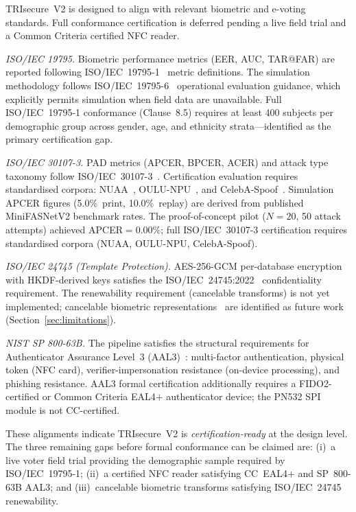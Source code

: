 \documentclass[conference]{IEEEtran}
\begin{document}
TRIsecure~V2 is designed to align with relevant biometric and
e-voting standards. Full conformance certification is deferred pending a
live field trial and a Common Criteria certified NFC reader.

\textit{ISO/IEC 19795.} Biometric performance metrics (EER, AUC,
TAR@FAR) are reported following ISO/IEC~19795-1~\cite{iso19795}
metric definitions. The simulation methodology follows
ISO/IEC~19795-6~\cite{iso19795_6} operational evaluation guidance,
which explicitly permits simulation when field data are unavailable.
Full ISO/IEC~19795-1 conformance (Clause~8.5) requires at least
400 subjects per demographic group across gender, age, and ethnicity
strata—identified as the primary certification gap.

\textit{ISO/IEC 30107-3.} PAD metrics (APCER, BPCER, ACER) and
attack type taxonomy follow ISO/IEC~30107-3~\cite{iso30107}.
Certification evaluation requires standardised corpora:
NUAA~\cite{tan2010nuaa}, OULU-NPU~\cite{boulkenafet2017oulu},
and CelebA-Spoof~\cite{zhang2020minifasnet}. Simulation APCER figures (5.0\%~print, 10.0\%~replay) are derived from
published MiniFASNetV2 benchmark rates. The proof-of-concept pilot
(\(N{=}20\), 50 attack attempts) achieved APCER\(=0.00\%\); full
ISO/IEC~30107-3 certification requires standardised corpora
(NUAA, OULU-NPU, CelebA-Spoof).

\textit{ISO/IEC 24745 (Template Protection).} AES-256-GCM per-database
encryption with HKDF-derived keys satisfies the
ISO/IEC~24745:2022~\cite{iso24745} confidentiality requirement.
The renewability requirement (cancelable transforms) is not
yet implemented; cancelable biometric
representations~\cite{jain2008cancelable} are identified as future
work (Section~\ref{sec:limitations}).

\textit{NIST SP 800-63B.} The pipeline satisfies the structural
requirements for Authenticator Assurance Level~3
(AAL3)~\cite{nist_sp800_63b}: multi-factor authentication,
physical token (NFC card), verifier-impersonation resistance
(on-device processing), and phishing resistance. AAL3 formal
certification additionally requires a FIDO2-certified or Common
Criteria EAL4\(+\) authenticator device; the PN532 SPI module
is not CC-certified.

These alignments indicate TRIsecure~V2 is \emph{certification-ready}
at the design level. The three remaining gaps before formal
conformance can be claimed are: (i)~a live voter field trial
providing the demographic sample required by ISO/IEC~19795-1;
(ii)~a certified NFC reader satisfying CC~EAL4\(+\) and SP~800-63B
AAL3; and (iii)~cancelable biometric transforms satisfying
ISO/IEC~24745 renewability.
\end{document}
